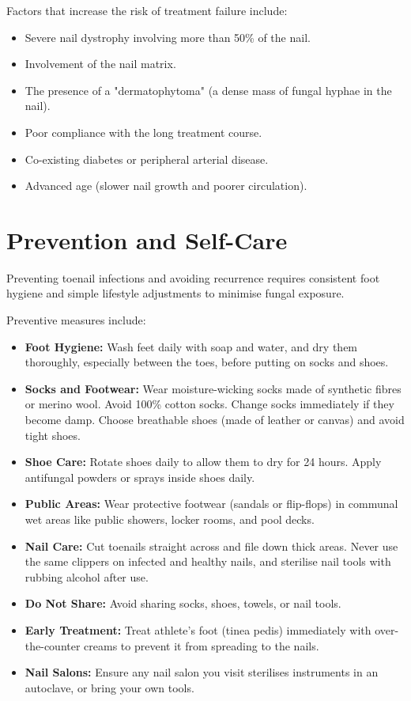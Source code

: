 Factors that increase the risk of treatment failure include:
\begin{itemize}
    \item Severe nail dystrophy involving more than 50\% of the nail.
    \item Involvement of the nail matrix.
    \item The presence of a "dermatophytoma" (a dense mass of fungal hyphae in the nail).
    \item Poor compliance with the long treatment course.
    \item Co-existing diabetes or peripheral arterial disease.
    \item Advanced age (slower nail growth and poorer circulation).
\end{itemize}

\section*{Prevention and Self-Care}
Preventing toenail infections and avoiding recurrence requires consistent foot hygiene and simple lifestyle adjustments to minimise fungal exposure.

Preventive measures include:
\begin{itemize}
    \item \textbf{Foot Hygiene:} Wash feet daily with soap and water, and dry them thoroughly, especially between the toes, before putting on socks and shoes.
    \item \textbf{Socks and Footwear:} Wear moisture-wicking socks made of synthetic fibres or merino wool. Avoid 100\% cotton socks. Change socks immediately if they become damp. Choose breathable shoes (made of leather or canvas) and avoid tight shoes.
    \item \textbf{Shoe Care:} Rotate shoes daily to allow them to dry for 24 hours. Apply antifungal powders or sprays inside shoes daily.
    \item \textbf{Public Areas:} Wear protective footwear (sandals or flip-flops) in communal wet areas like public showers, locker rooms, and pool decks.
    \item \textbf{Nail Care:} Cut toenails straight across and file down thick areas. Never use the same clippers on infected and healthy nails, and sterilise nail tools with rubbing alcohol after use.
    \item \textbf{Do Not Share:} Avoid sharing socks, shoes, towels, or nail tools.
    \item \textbf{Early Treatment:} Treat athlete's foot (tinea pedis) immediately with over-the-counter creams to prevent it from spreading to the nails.
    \item \textbf{Nail Salons:} Ensure any nail salon you visit sterilises instruments in an autoclave, or bring your own tools.
\end{itemize}

